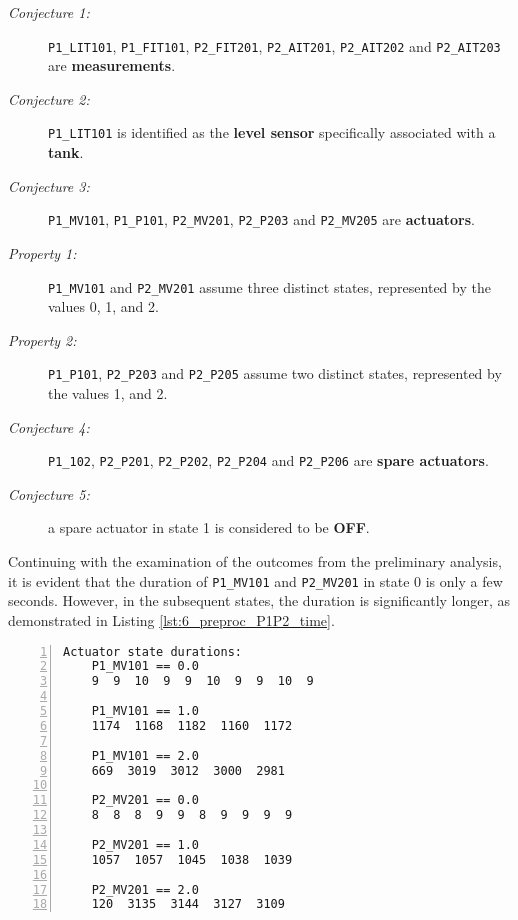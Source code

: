 \begin{description}
	\item[\colorbox{backcolourtext}{\normalfont\textit{Conjecture 1:}}] \texttt{P1\_LIT101}, \texttt{P1\_FIT101}, \texttt{P2\_FIT201}, \texttt{P2\_AIT201}, \texttt{P2\_AIT202} and \texttt{P2\_AIT203} are \textbf{measurements}.
	
	\item[\colorbox{backcolourtext}{\normalfont\textit{Conjecture 2:}}] \texttt{P1\_LIT101} is identified as the \textbf{level sensor} specifically associated with a \textbf{tank}.
	
	\item[\colorbox{backcolourtext}{\normalfont\textit{Conjecture 3:}}] \texttt{P1\_MV101}, \texttt{P1\_P101}, \texttt{P2\_MV201}, \texttt{P2\_P203} and \texttt{P2\_MV205} are \textbf{actuators}.
	
	\item[\colorbox{backcolourtext}{\normalfont\textit{Property 1:}}] \texttt{P1\_MV101} and \texttt{P2\_MV201} assume three distinct states, represented by the values 0, 1, and 2.
	
	\item[\colorbox{backcolourtext}{\normalfont\textit{Property 2:}}] \texttt{P1\_P101}, \texttt{P2\_P203} and \texttt{P2\_P205} assume two distinct states, represented by the values 1, and 2.
	
	\item[\colorbox{backcolourtext}{\normalfont\textit{Conjecture 4:}}] \texttt{P1\_102}, \texttt{P2\_P201}, \texttt{P2\_P202}, \texttt{P2\_P204} and \texttt{P2\_P206} are \textbf{spare actuators}.
	
	\item[\colorbox{backcolourtext}{\normalfont\textit{Conjecture 5:}}] a spare actuator in state 1 is considered to be \textbf{OFF}.
	
\end{description}

Continuing with the examination of the outcomes from the preliminary analysis, it is evident that the duration of \texttt{P1\_MV101} and \texttt{P2\_MV201} in state 0 is only a few seconds. However, in the subsequent states, the duration is significantly longer, as demonstrated in Listing \ref{lst:6_preproc_P1P2_time}. 

\begin{lstlisting}[language=bash, numbers=left, caption=Time duration of the states of actuators MV101 and MV201 of PLC1-2, label=lst:6_preproc_P1P2_time]
	Actuator state durations:
	P1_MV101 == 0.0
	9  9  10  9  9  10  9  9  10  9
	
	P1_MV101 == 1.0
	1174  1168  1182  1160  1172
	
	P1_MV101 == 2.0
	669  3019  3012  3000  2981
	
	P2_MV201 == 0.0
	8  8  8  9  9  8  9  9  9  9
	
	P2_MV201 == 1.0
	1057  1057  1045  1038  1039
	
	P2_MV201 == 2.0
	120  3135  3144  3127  3109
\end{lstlisting}

